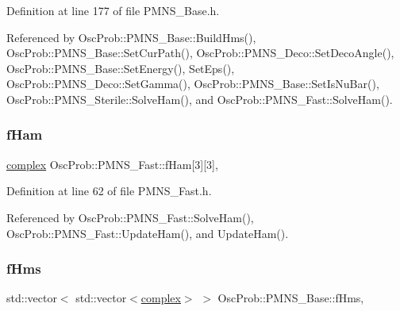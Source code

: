 Definition at line 177 of file P\+M\+N\+S\+\_\+\+Base.\+h.



Referenced by Osc\+Prob\+::\+P\+M\+N\+S\+\_\+\+Base\+::\+Build\+Hms(), Osc\+Prob\+::\+P\+M\+N\+S\+\_\+\+Base\+::\+Set\+Cur\+Path(), Osc\+Prob\+::\+P\+M\+N\+S\+\_\+\+Deco\+::\+Set\+Deco\+Angle(), Osc\+Prob\+::\+P\+M\+N\+S\+\_\+\+Base\+::\+Set\+Energy(), Set\+Eps(), Osc\+Prob\+::\+P\+M\+N\+S\+\_\+\+Deco\+::\+Set\+Gamma(), Osc\+Prob\+::\+P\+M\+N\+S\+\_\+\+Base\+::\+Set\+Is\+Nu\+Bar(), Osc\+Prob\+::\+P\+M\+N\+S\+\_\+\+Sterile\+::\+Solve\+Ham(), and Osc\+Prob\+::\+P\+M\+N\+S\+\_\+\+Fast\+::\+Solve\+Ham().

\mbox{\label{classOscProb_1_1PMNS__Fast_aab37f2a7f59ab7026a8a21a561115dd0}} 
\subsubsection{\texorpdfstring{f\+Ham}{fHam}}
{\footnotesize\ttfamily \hyperlink{classOscProb_1_1PMNS__Base_ae86ec4718808ce9d02e5f5b4226714ab}{complex} Osc\+Prob\+::\+P\+M\+N\+S\+\_\+\+Fast\+::f\+Ham\mbox{[}3\mbox{]}\mbox{[}3\mbox{]}\hspace{0.3cm}{\ttfamily [protected]}, {\ttfamily [inherited]}}



Definition at line 62 of file P\+M\+N\+S\+\_\+\+Fast.\+h.



Referenced by Osc\+Prob\+::\+P\+M\+N\+S\+\_\+\+Fast\+::\+Solve\+Ham(), Osc\+Prob\+::\+P\+M\+N\+S\+\_\+\+Fast\+::\+Update\+Ham(), and Update\+Ham().

\mbox{\label{classOscProb_1_1PMNS__Base_adf5901166216e8c7a5cff2092952f473}} 
\subsubsection{\texorpdfstring{f\+Hms}{fHms}}
{\footnotesize\ttfamily std\+::vector$<$ std\+::vector$<$\hyperlink{classOscProb_1_1PMNS__Base_ae86ec4718808ce9d02e5f5b4226714ab}{complex}$>$ $>$ Osc\+Prob\+::\+P\+M\+N\+S\+\_\+\+Base\+::f\+Hms\hspace{0.3cm}{\ttfamily [protected]}, {\ttfamily [inherited]}}



